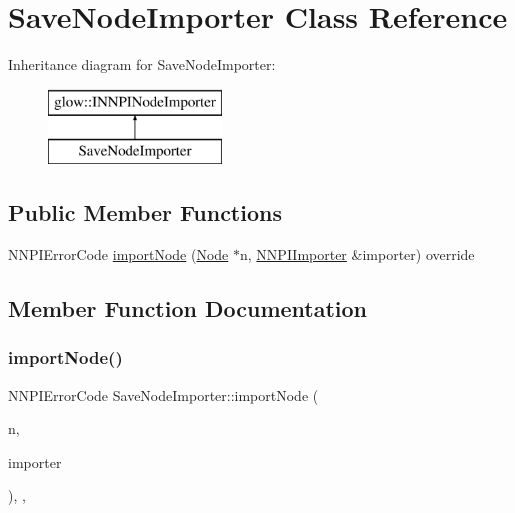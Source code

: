 \hypertarget{class_save_node_importer}{}\section{Save\+Node\+Importer Class Reference}
\label{class_save_node_importer}
Inheritance diagram for Save\+Node\+Importer\+:\begin{figure}[H]
\begin{center}
\leavevmode
\includegraphics[height=2.000000cm]{class_save_node_importer}
\end{center}
\end{figure}
\subsection*{Public Member Functions}
\begin{DoxyCompactItemize}
\item 
N\+N\+P\+I\+Error\+Code \hyperlink{class_save_node_importer_aed61c7228a7764c207fdeadb66bd6ac5}{import\+Node} (\hyperlink{classglow_1_1_node}{Node} $\ast$n, \hyperlink{classglow_1_1_n_n_p_i_importer}{N\+N\+P\+I\+Importer} \&importer) override
\end{DoxyCompactItemize}


\subsection{Member Function Documentation}
\mbox{\label{class_save_node_importer_aed61c7228a7764c207fdeadb66bd6ac5}} 
\subsubsection{\texorpdfstring{import\+Node()}{importNode()}}
{\footnotesize\ttfamily N\+N\+P\+I\+Error\+Code Save\+Node\+Importer\+::import\+Node (\begin{DoxyParamCaption}\item[{\hyperlink{classglow_1_1_node}{Node} $\ast$}]{n,  }\item[{\hyperlink{classglow_1_1_n_n_p_i_importer}{N\+N\+P\+I\+Importer} \&}]{importer }\end{DoxyParamCaption})\hspace{0.3cm}{\ttfamily [inline]}, {\ttfamily [override]}, {\ttfamily [virtual]}}

